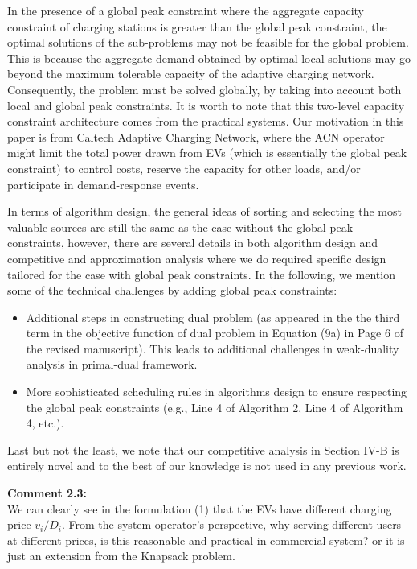 \documentclass[11pt]{article}
\begin{document}
In the presence of a global peak constraint where the aggregate capacity constraint of charging stations is greater than the global peak constraint, the optimal solutions of the sub-problems may not be feasible for the global problem. This is because the aggregate demand obtained by optimal local solutions may go beyond the maximum tolerable capacity of the adaptive charging network. Consequently, the problem must be solved globally, by taking into account both local and global peak constraints. 
It is worth to note that this two-level capacity constraint architecture comes from the practical systems. Our motivation in this paper is from Caltech Adaptive Charging Network, where the ACN operator might limit the total power drawn from EVs (which is essentially the global peak constraint) to control costs, reserve the capacity for other loads, and/or participate in demand-response events. 

In terms of algorithm design, the general ideas of sorting and selecting the most valuable sources are still the same as the case without the global peak constraints, however, there are several details in both algorithm design and competitive and approximation analysis where we do required specific design tailored for the case with global peak constraints. In the following, we mention some of the technical challenges by adding global peak constraints:
\begin{itemize}
	\item Additional steps in constructing dual  problem (as appeared in the the third term in the objective function of dual problem in Equation (9a) in Page 6 of the revised manuscript). This leads to additional challenges in weak-duality analysis in primal-dual framework. 
	\item More sophisticated scheduling rules in algorithms design to ensure respecting the global peak constraints (e.g., Line 4 of Algorithm 2, Line 4 of Algorithm 4, etc.). 
\end{itemize}
Last but not the least, we note that our competitive analysis in Section IV-B is entirely novel and to the best of our knowledge is not used in any previous work. 


\vspace{5mm}
{
{\color{blue}\noindent\textbf{Comment 2.3:}\\
We can clearly see in the formulation (1) that the EVs have different charging price $v_i/D_i$. From the system operator's perspective, why serving different users at different prices, is this reasonable and practical in commercial system? or it is just an extension from the Knapsack problem.
}}
\end{document}

